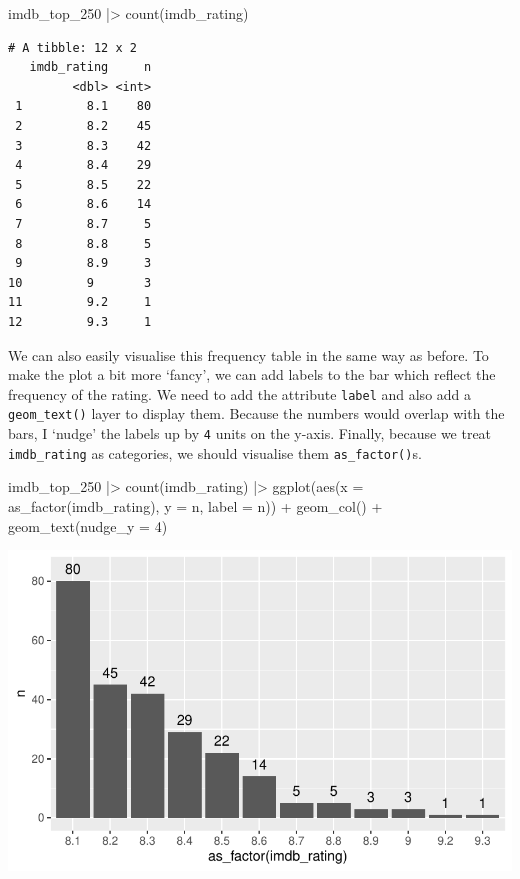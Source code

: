 \documentclass[
  letterpaper,
]{krantz}
\makeatletter
\newenvironment{Shaded}{\begin{snugshade}}{\end{snugshade}}
\newcommand{\AttributeTok}[1]{\textcolor[rgb]{0.40,0.45,0.13}{#1}}
\newcommand{\DecValTok}[1]{\textcolor[rgb]{0.68,0.00,0.00}{#1}}
\newcommand{\FunctionTok}[1]{\textcolor[rgb]{0.28,0.35,0.67}{#1}}
\newcommand{\NormalTok}[1]{\textcolor[rgb]{0.00,0.23,0.31}{#1}}
\newcommand{\SpecialCharTok}[1]{\textcolor[rgb]{0.37,0.37,0.37}{#1}}
\newenvironment{kframe}{%
\medskip{}
\setlength{\fboxsep}{.8em}
 \def\at@end@of@kframe{}%
 \ifinner\ifhmode%
  \def\at@end@of@kframe{\end{minipage}}%
  \begin{minipage}{\columnwidth}%
 \fi\fi%
 \def\FrameCommand##1{\hskip\@totalleftmargin \hskip-\fboxsep
 \colorbox{shadecolor}{##1}\hskip-\fboxsep
     \hskip-\linewidth \hskip-\@totalleftmargin \hskip\columnwidth}%
 \MakeFramed {\advance\hsize-\width
   \@totalleftmargin\z@ \linewidth\hsize
   \@setminipage}}%
 {\par\unskip\endMakeFramed%
 \at@end@of@kframe}
\renewenvironment{Shaded}{\begin{kframe}}{\end{kframe}}
\makeatother
\begin{document}
\begin{Shaded}
\begin{Highlighting}[]
\NormalTok{imdb\_top\_250 }\SpecialCharTok{|\textgreater{}} \FunctionTok{count}\NormalTok{(imdb\_rating)}
\end{Highlighting}
\end{Shaded}

\begin{verbatim}
# A tibble: 12 x 2
   imdb_rating     n
         <dbl> <int>
 1         8.1    80
 2         8.2    45
 3         8.3    42
 4         8.4    29
 5         8.5    22
 6         8.6    14
 7         8.7     5
 8         8.8     5
 9         8.9     3
10         9       3
11         9.2     1
12         9.3     1
\end{verbatim}

We can also easily visualise this frequency table in the same way as
before. To make the plot a bit more `fancy', we can add labels to the
bar which reflect the frequency of the rating. We need to add the
attribute \texttt{label} and also add a \texttt{geom\_text()} layer to
display them. Because the numbers would overlap with the bars, I `nudge'
the labels up by \texttt{4} units on the y-axis. Finally, because we
treat \texttt{imdb\_rating} as categories, we should visualise them
\texttt{as\_factor()}s.

\begin{Shaded}
\begin{Highlighting}[]
\NormalTok{imdb\_top\_250 }\SpecialCharTok{|\textgreater{}}
  \FunctionTok{count}\NormalTok{(imdb\_rating) }\SpecialCharTok{|\textgreater{}}
  \FunctionTok{ggplot}\NormalTok{(}\FunctionTok{aes}\NormalTok{(}\AttributeTok{x =} \FunctionTok{as\_factor}\NormalTok{(imdb\_rating),}
             \AttributeTok{y =}\NormalTok{ n,}
             \AttributeTok{label =}\NormalTok{ n)) }\SpecialCharTok{+}
  \FunctionTok{geom\_col}\NormalTok{() }\SpecialCharTok{+}
  \FunctionTok{geom\_text}\NormalTok{(}\AttributeTok{nudge\_y =} \DecValTok{4}\NormalTok{)}
\end{Highlighting}
\end{Shaded}

\includegraphics{08_descriptive_statistics_files/figure-pdf/mode-visualised-as-freq-table-1.pdf}
\end{document}
